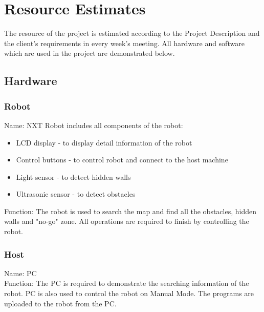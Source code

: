 \documentclass[11pt, a4paper]{report}
\begin{document}


\pagebreak




\chapter{Resource Estimates} %
\label{cha:RE}
The resource of the project is estimated according to the Project Description and the client's requirements in every week's meeting. All hardware and software which are used in the project are demonstrated below.
\section{Hardware}
\subsection{Robot}
Name: NXT Robot includes all components of the robot:
\begin{itemize}
\item LCD display - to display detail information of the robot
\item Control buttons - to control  robot and connect to the host machine
\item Light sensor - to detect hidden walls
\item Ultrasonic sensor - to detect obstacles
\end{itemize}
Function: The robot is used to search the map and find all the obstacles, hidden walls and "no-go" zone. All operations are required to finish by controlling the robot.
\subsection{Host}
Name: PC\\
Function: The PC is required to demonstrate the searching information of the robot. PC is also used to control the robot on Manual Mode. The programs are uploaded to the robot from the PC.
\end{document}
